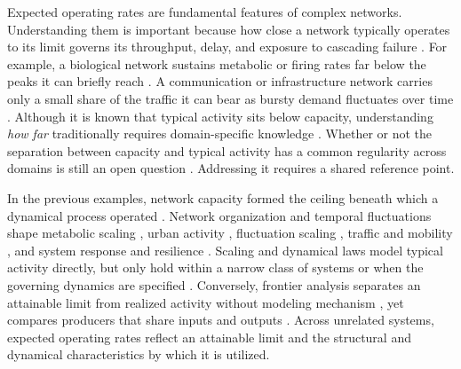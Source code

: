 \documentclass{article}
\begin{document}
\begingroup
\renewcommand{\abstractname}{Significance}
\begin{abstract}
\noindent
    Networked systems rarely operate near their limits. Seismic detection systems, pollination networks, and online marketplaces all exhibit typical activity well below their peaks. That distance is traditionally measured one field at a time. Consequently, activity from one system usually reveals little about another. Here, we demonstrate that when a network's capacity is estimated from its structure and dynamics, typical activity across a wide range of disciplines sits at a regular distance beneath it. This regularity allows researchers and practitioners to use cross-disciplinary evidence to estimate expected operating rates in complex networks.
\end{abstract}
\endgroup
\clearpage

\vspace{1em}
\label{sec:intro}
Expected operating rates are fundamental features of complex networks. Understanding them is important because how close a network typically operates to its limit governs its throughput, delay, and exposure to cascading failure \citep{ref35,ref183,ref152,ref150,ref158,ref161}. For example, a biological network sustains metabolic or firing rates far below the peaks it can briefly reach \citep{ref155,ref156,ref157,ref163,ref175,ref164}. A communication or infrastructure network carries only a small share of the traffic it can bear as bursty demand fluctuates over time \citep{ref153,ref154,ref113,ref110,ref165,ref10,ref160,ref159}. Although it is known that typical activity sits below capacity, understanding \textit{how far} traditionally requires domain-specific knowledge \citep{ref151,ref135,ref162,ref79}. Whether or not the separation between capacity and typical activity has a common regularity across domains is still an open question \citep{ref13,ref14,ref15,ref122}. Addressing it requires a shared reference point.

In the previous examples, network capacity formed the ceiling beneath which a dynamical process operated \citep{ref06,ref15,ref35,ref122}. Network organization and temporal fluctuations shape metabolic scaling \citep{ref124,ref17,ref126,ref125}, urban activity \citep{ref18,ref121}, fluctuation scaling \citep{ref13,ref14,ref127}, traffic and mobility \citep{ref01,ref133,ref171,ref128,ref24,ref166,ref35}, and system response and resilience \citep{ref15,ref16,ref129,ref130}. Scaling and dynamical laws model typical activity directly, but only hold within a narrow class of systems or when the governing dynamics are specified \citep{ref06,ref134,ref132,ref131}. Conversely, frontier analysis separates an attainable limit from realized activity without modeling mechanism \citep{ref103,ref19,ref20,ref21,ref169}, yet compares producers that share inputs and outputs \citep{ref170,ref23,ref185}. Across unrelated systems, expected operating rates reflect an attainable limit and the structural and dynamical characteristics by which it is utilized.
\end{document}
